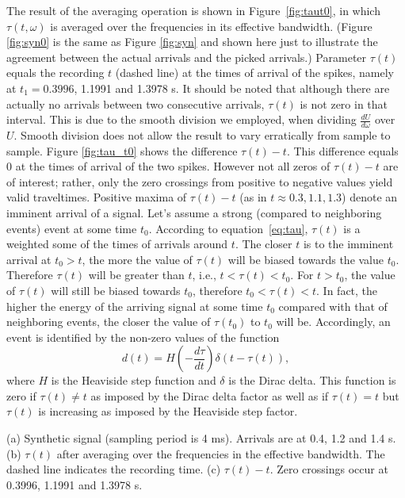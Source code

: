 The result of the averaging operation is shown in Figure~\ref{fig:taut0}, in which $\tau(t,\omega)$ is averaged over the frequencies in its effective bandwidth. (Figure \ref{fig:syn0} is the same as Figure \ref{fig:syn} and shown here just to illustrate the agreement between the actual arrivals and the picked arrivals.) Parameter $\tau(t)$ equals the recording $t$ (dashed line) at the times of arrival of the spikes, namely at $t_1=0.3996$, 1.1991 and 1.3978 s. It should be noted that although there are actually no arrivals between two consecutive arrivals, $\tau(t)$ is not zero in that interval. This is due to the smooth division we employed, when dividing $\frac{dU}{d\omega}$ over $U$. Smooth division does not allow the result to vary erratically from sample to sample. 
Figure \ref{fig:tau_t0} shows the difference $\tau(t)-t$. This difference equals 0 at the times of arrival of the two spikes. 
However not all zeros of $\tau(t)-t$ are of interest; rather, only the zero crossings from positive to negative values yield valid traveltimes. Positive maxima of $\tau(t)-t$ (as in $t\approx0.3, 1.1, 1.3$) denote an imminent arrival of a signal. Let's assume a strong (compared to neighboring events) event at some time $t_0$. According to equation~\ref{eq:tau}, $\tau(t)$ is a weighted some of the times of arrivals around $t$. The closer $t$ is to the imminent arrival at $t_0>t$, the more the value of $\tau(t)$ will be biased towards the value $t_0$. Therefore $\tau(t)$ will be greater than $t$, i.e., $t<\tau(t)<t_0$. For $t>t_0$, the value of $\tau(t)$ will still be biased towards $t_0$, therefore $t_0<\tau(t)<t$. In fact, the higher the energy of the arriving signal at some time $t_0$ compared with that of neighboring events, the closer the value of $\tau(t_0)$ to $t_0$ will be. 
Accordingly, an event is identified by the non-zero values of the function 
\begin{equation}
   d(t) = H\left(-\frac{d\tau}{dt}\right) \delta(t-\tau(t)),\label{eq:attr}
\end{equation}
where $H$ is the Heaviside step function and $\delta$ is the Dirac delta. This function is zero if $\tau(t)\neq t$ as imposed by the Dirac delta factor as well as if $\tau(t)=t$ but $\tau(t)$ is increasing as imposed by the Heaviside step factor.


{(a) Synthetic signal (sampling period is 4 ms). Arrivals are at 0.4, 1.2 and 1.4 s. 
 (b) $\tau(t)$ after averaging over the frequencies in the effective bandwidth. The dashed line indicates the recording time. 
 (c) $\tau(t)-t$. Zero crossings occur at 0.3996, 1.1991 and 1.3978 s.}%


